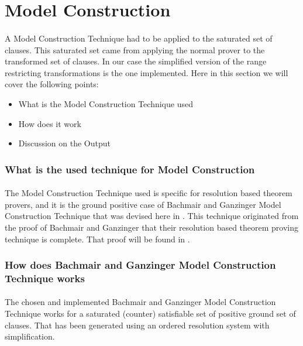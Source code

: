 \section{Model Construction}\label{sec:c3s2}
\paragraph{}
A Model Construction Technique had to be applied to the saturated set of clauses. This saturated set came from applying the normal prover to the transformed set of clauses. In our case the simplified version of the range restricting transformations is the one implemented. Here in this section we will cover the following points:

	\begin{itemize}
		\item What is the Model Construction Technique used
		\item How does it work
		\item Discussion on the Output
	\end{itemize}
	
	
	\subsubsection{What is the used technique for Model Construction}
		\paragraph{}
		The Model Construction Technique used is specific for resolution based theorem provers, and it is the ground positive case of Bachmair and Ganzinger Model Construction Technique that was devised here in \cite{BGMC}. This technique originated from the proof of Bachmair and Ganzinger that their resolution based theorem proving technique is complete. That proof will be found in \cite{BAGA01}.
		
		
	\subsubsection{How does Bachmair and Ganzinger Model Construction Technique works}
		\paragraph{}		
		The chosen and implemented Bachmair and Ganzinger Model Construction Technique works for a saturated (counter) satisfiable set of positive ground set of clauses. That has been generated using an ordered resolution system with simplification. 
		
